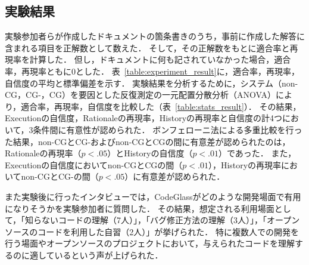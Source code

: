 \subsection{実験結果}

実験参加者らが作成したドキュメントの箇条書きのうち，事前に作成した解答に含まれる項目を正解数として数えた．
そして，その正解数をもとに適合率と再現率を計算した．
但し，ドキュメントに何も記されていなかった場合，適合率，再現率ともに0とした．
表~\ref{table:experiment_result}に，適合率，再現率，自信度の平均と標準偏差を示す．
実験結果を分析するために，システム（non-CG，CG-，CG）を要因とした反復測定の一元配置分散分析（ANOVA）により，適合率，再現率，自信度を比較した（表~\ref{table:stats_result}）．
その結果，Executionの自信度，Rationaleの再現率，Historyの再現率と自信度の計4つにおいて，3条件間に有意性が認められた．
ボンフェローニ法による多重比較を行った結果，non-CGとCG-およびnon-CGとCGの間に有意差が認められたのは，Rationaleの再現率（$p<.05$）とHistoryの自信度（$p<.01$）であった．
また，Executionの自信度においてnon-CGとCGの間（$p<.01$），Historyの再現率においてnon-CGとCG-の間（$p<.05$）に有意差が認められた．



また実験後に行ったインタビューでは，CodeGlassがどのような開発場面で有用になりそうかを実験参加者に質問した．
その結果，想定される利用場面として，「知らないコードの理解（7人）」，「バグ修正方法の理解（3人）」，「オープンソースのコードを利用した自習（2人）」が挙げられた．
特に複数人での開発を行う場面やオープンソースのプロジェクトにおいて，与えられたコードを理解するのに適しているという声が上げられた．

